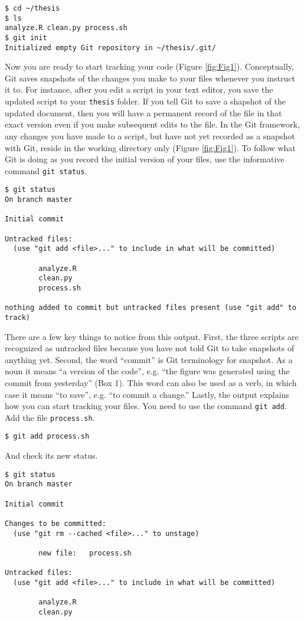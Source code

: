 \begin{verbatim}
$ cd ~/thesis
$ ls
analyze.R clean.py process.sh
$ git init
Initialized empty Git repository in ~/thesis/.git/
\end{verbatim}

Now you are ready to start tracking your code (Figure \ref{fig:Fig1}).
Conceptually, Git saves snapshots of the changes you make to your files whenever you instruct it to.
For instance, after you edit a script in your text editor, you save the updated script to your \verb|thesis| folder.
If you tell Git to save a shapshot of the updated document, then you will have a permanent record of the file in that exact version even if you make subsequent edits to the file.
In the Git framework, any changes you have made to a script, but have not yet recorded as a snapshot with Git, reside in the working directory only (Figure \ref{fig:Fig1}).
To follow what Git is doing as you record the initial version of your files, use the informative command \verb|git status|.

\begin{verbatim}
$ git status
On branch master

Initial commit

Untracked files:
  (use "git add <file>..." to include in what will be committed)

        analyze.R
        clean.py
        process.sh

nothing added to commit but untracked files present (use "git add" to track)
\end{verbatim}

There are a few key things to notice from this output.
First, the three scripts are recognized as untracked files because you have not told Git to take snapshots of anything yet.
Second, the word ``commit'' is Git terminology for snapshot.
As a noun it means ``a version of the code'', e.g. ``the figure was generated using the commit from yesterday'' (Box 1).
This word can also be used as a verb, in which case it means ``to save'', e.g. ``to commit a change.''
Lastly, the output explains how you can start tracking your files.
You need to use the command \verb|git add|.
Add the file \verb|process.sh|.

\begin{verbatim}
$ git add process.sh
\end{verbatim}

And check its new status.

\begin{verbatim}
$ git status
On branch master

Initial commit

Changes to be committed:
  (use "git rm --cached <file>..." to unstage)

        new file:   process.sh

Untracked files:
  (use "git add <file>..." to include in what will be committed)

        analyze.R
        clean.py
\end{verbatim}


